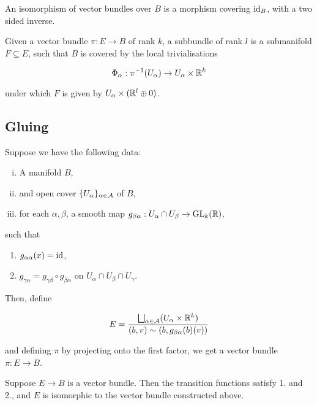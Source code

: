 \begin{definition}

    An isomorphism of vector bundles over \(B\) is a morphism covering \(\operatorname{id}_B\), with a two sided inverse.
\end{definition}

\begin{definition}
     Given a vector bundle \(\pi : E \to B\) of rank \(k\), a subbundle of rank \(l\) is a submanifold \(F \subseteq E\), such that \(B\) is covered by the local trivialisations

    \[\Phi_\alpha : \pi^{-1}(U_\alpha) \to U_\alpha \times \mathbb{R}^k\]

    under which \(F\) is given by \(U_\alpha \times (\mathbb{R}^l \oplus 0)\).
\end{definition}

\subsection{Gluing}

Suppose we have the following data:

\begin{enumerate}[(i)]
    \item A manifold \(B\),
    \item and open cover \(\{U_\alpha\}_{\alpha \in \mathcal{A}}\) of \(B\),
    \item for each \(\alpha, \beta\), a smooth map \(g_{\beta\alpha} : U_\alpha \cap U_\beta \to \operatorname{GL}_k(\mathbb{R})\),
\end{enumerate}

such that

\begin{enumerate}
    \item \(g_{\alpha\alpha}(x) = \operatorname{id}\),
    \item \(g_{\gamma\alpha} = g_{\gamma\beta} \circ g_{\beta\alpha}\) on \(U_\alpha \cap U_\beta \cap U_\gamma\).
\end{enumerate}

Then, define

\[E = \frac{\bigsqcup_{\alpha \in \mathcal{A}}(U_\alpha \times \mathbb{R}^k)}{(b, v) \sim (b, g_{\beta\alpha}(b)(v))}\]

and defining \(\pi\) by projecting onto the first factor, we get a vector bundle \(\pi : E \to B\).

\begin{lemma}
    Suppose \(E \to B\) is a vector bundle. Then the transition functions satisfy 1. and 2., and \(E\) is isomorphic to the vector bundle constructed above.
\end{lemma}

